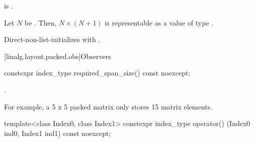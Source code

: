 \begin{itemdescr}
\pnum
\constraints
{} is .

\pnum
\expects
Let $N$ be .
Then, $N \times (N+1)$ is representable as
a value of type .

\pnum
\effects
Direct-non-list-initializes  with .
\end{itemdescr}

[linalg.layout.packed.obs]{Observers}

%
\begin{itemdecl}
constexpr index_type required_span_size() const noexcept;
\end{itemdecl}

\begin{itemdescr}
\pnum
\returns
{}.
\begin{note}
For example, a 5 x 5 packed matrix
only stores 15 matrix elements.
\end{note}
\end{itemdescr}

%
\begin{itemdecl}
template<class Index0, class Index1>
  constexpr index_type operator() (Index0 ind0, Index1 ind1) const noexcept;
\end{itemdecl}

